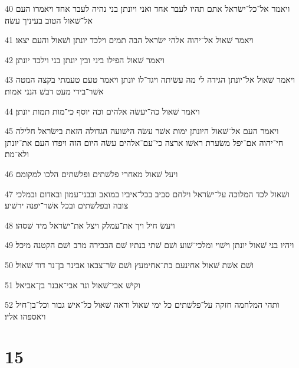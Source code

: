 \par 40 ויאמר אל־כל־ישׂראל אתם תהיו לעבר אחד ואני ויונתן בני נהיה לעבר אחד ויאמרו העם אל־שׁאול הטוב בעיניך עשׂה׃
\par 41 ויאמר שׁאול אל־יהוה אלהי ישׂראל הבה תמים וילכד יונתן ושׁאול והעם יצאו׃
\par 42 ויאמר שׁאול הפילו ביני ובין יונתן בני וילכד יונתן׃
\par 43 ויאמר שׁאול אל־יונתן הגידה לי מה עשׂיתה ויגד־לו יונתן ויאמר טעם טעמתי בקצה המטה אשׁר־בידי מעט דבשׁ הנני אמות׃
\par 44 ויאמר שׁאול כה־יעשׂה אלהים וכה יוסף כי־מות תמות יונתן׃
\par 45 ויאמר העם אל־שׁאול היונתן ימות אשׁר עשׂה הישׁועה הגדולה הזאת בישׂראל חלילה חי־יהוה אם־יפל משׂערת ראשׁו ארצה כי־עם־אלהים עשׂה היום הזה ויפדו העם את־יונתן ולא־מת׃
\par 46 ויעל שׁאול מאחרי פלשׁתים ופלשׁתים הלכו למקומם׃
\par 47 ושׁאול לכד המלוכה על־ישׂראל וילחם סביב בכל־איביו במואב ובבני־עמון ובאדום ובמלכי צובה ובפלשׁתים ובכל אשׁר־יפנה ירשׁיע׃
\par 48 ויעשׂ חיל ויך את־עמלק ויצל את־ישׂראל מיד שׁסהו׃
\par 49 ויהיו בני שׁאול יונתן וישׁוי ומלכי־שׁוע ושׁם שׁתי בנתיו שׁם הבכירה מרב ושׁם הקטנה מיכל׃
\par 50 ושׁם אשׁת שׁאול אחינעם בת־אחימעץ ושׁם שׂר־צבאו אבינר בן־נר דוד שׁאול׃
\par 51 וקישׁ אבי־שׁאול ונר אבי־אבנר בן־אביאל׃
\par 52 ותהי המלחמה חזקה על־פלשׁתים כל ימי שׁאול וראה שׁאול כל־אישׁ גבור וכל־בן־חיל ויאספהו אליו׃

\chapter{15}


